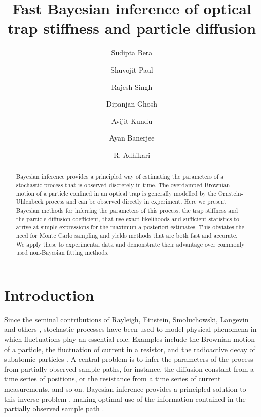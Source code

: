 \documentclass[fleqn,10pt]{wlscirep}
\begin{document}
\title{Fast Bayesian inference of optical trap stiffness and particle diffusion}

\author[1]{Sudipta Bera}
\author[1]{Shuvojit Paul}
\author[2]{Rajesh Singh}
\author[3]{Dipanjan Ghosh}
\author[1]{Avijit Kundu}
\author[1,*]{Ayan Banerjee}
\author[2,+]{R. Adhikari}




\begin{abstract}
Bayesian inference provides a principled way of estimating the parameters
of a stochastic process that is observed discretely in time. The overdamped
Brownian motion of a particle confined in an optical trap is generally
modelled by the Ornstein-Uhlenbeck process and can be observed directly
in experiment. Here we present Bayesian methods for inferring the
parameters of this process, the trap stiffness and the particle diffusion
coefficient, that use exact likelihoods and sufficient statistics
to arrive at simple expressions for the maximum a posteriori estimates.
This obviates the need for Monte Carlo sampling and yields methods
that are both fast and accurate. We apply these to experimental data
and demonstrate their advantage over commonly used non-Bayesian fitting
methods. 
\end{abstract}
\flushbottom
\maketitle

\section*{Introduction}
Since the seminal contributions of Rayleigh, Einstein, Smoluchowski,
Langevin and others \cite{chandrasekhar1943stochastic}, stochastic
processes have been used to model physical phenomena in which fluctuations
play an essential role. Examples include the Brownian motion of a
particle, the fluctuation of current in a resistor, and the radioactive
decay of subatomic particles \cite{van1992stochastic}. A central
problem is to infer the parameters of the process from partially observed
sample paths, for instance, the diffusion constant from a time series
of positions, or the resistance from a time series of current measurements,
and so on. Bayesian inference provides a principled solution to this
inverse problem \cite{jeffreys1998theory}, making optimal use of
the information contained in the partially observed sample path \cite{zellner1988optimal}. 
\end{document}
